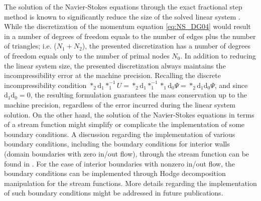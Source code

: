 \documentclass[final,12pt,times]{elsarticle}
\begin{document}
The solution of the Navier-Stokes equations through the exact fractional step method is known to significantly reduce the size of the solved linear system \cite{HallCavendish:1991dvmsvf,chang2002analysis}. While the discretization of the momentum equation \eqref{eq:NS_DG04} would result in a number of degrees of freedom equals to the number of edges plus the number of triangles; i.e. ($N_1 + N_2$), the presented discretization has a number of degrees of freedom equals only to the number of primal nodes $N_0$. In addition to reducing the linear system size, the presented discretization always maintains the incompressibility error at the machine precision. Recalling the discrete incompressibility condition $\ast_2 \textrm{d}_1 \ast^{-1}_1 U = \ast_2 \textrm{d}_1 \ast^{-1}_1 \ast_1 \textrm{d}_0 \Psi = \ast_2 \textrm{d}_1 \textrm{d}_0 \Psi$, and since $\textrm{d}_1 \textrm{d}_0 = 0$, the resulting formulation guarantees the mass conservation up to the machine precision, regardless of the error incurred during the linear system solution. On the other hand, the solution of the Navier-Stokes equations in terms of a stream function might simplify or complicate the implementation of some boundary conditions. A discussion regarding the implementation of various boundary conditions, including the boundary conditions for interior walls (domain boundaries with zero in/out flow), through the stream function can be found in \cite{chang2002analysis}. For the case of interior boundaries with nonzero in/out flow, the boundary conditions can be implemented through Hodge decomposition manipulation for the stream functions. More details regarding the implementation of such boundary conditions might be addressed in future publications.     
\end{document}
